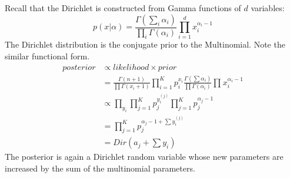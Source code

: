 \documentclass{article}%
\theoremstyle{definition}
\newtheorem{definition}{Definition}[section]
\begin{document}
Recall that the Dirichlet is constructed from Gamma functions of $d$ variables:
\begin{equation*}
p(x|\alpha) = \frac{\Gamma(\sum_i \alpha_i)}{\prod_i \Gamma(\alpha_i)}\prod\limits_{i=1}^{d}x_i^{\alpha_i-1}
\end{equation*}
The Dirichlet distribution is the conjugate prior to the Multinomial. Note the similar functional form. 
\begin{align*}
posterior &\propto likelihood \times prior \\
&= \frac{\Gamma(n+1)}{\prod \Gamma(x_i+1)} \prod\limits_{i=1}^{K}p_i^{x_i}\frac{\Gamma(\sum \alpha_i)}{\prod \Gamma(\alpha_i)}\prod\limits_{}^{}x_i^{\alpha_i-1} \\
&\propto \prod_{y_i}\prod_{j=1}^{K}p_j^{y_i^{(j)}}\prod\limits_{j=1}^{K} p_j^{\alpha_j-1}\\
&= \prod\limits_{j=1}^{K} p_j^{\alpha_j-1 + \sum y_i^{(j)}}\\
&= Dir(a_j + \sum y_i)
\end{align*}
The posterior is again a Dirichlet random variable whose new parameters are increased by the sum of the multinomial parameters.






\end{document}
